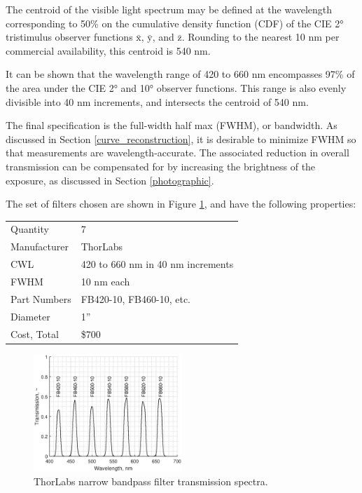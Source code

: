 \documentclass[twocolumn,10pt]{asme2ej}
\begin{document}
The centroid of the visible light spectrum may be defined at the wavelength corresponding to 50\% on the cumulative density function (CDF) of the CIE 2° tristimulus observer functions $\mathrm{\bar{x}}$, $\mathrm{\bar{y}}$, and $\mathrm{\bar{z}}$. Rounding to the nearest 10 nm per commercial availability, this centroid is 540 nm.

It can be shown that the wavelength range of 420 to 660 nm encompasses 97\% of the area under the CIE 2° and 10° observer functions. This range is also evenly divisible into 40 nm increments, and intersects the centroid of 540 nm.

The final specification is the full-width half max (FWHM), or bandwidth. As discussed in Section \ref{curve_reconstruction}, it is desirable to minimize FWHM so that measurements are wavelength-accurate. The associated reduction in overall transmission can be compensated for by increasing the brightness of the exposure, as discussed in Section \ref{photographic}.

The set of filters chosen are shown in Figure \ref{thorlabs_filter_transmission_spectra}, and have the following properties:\\

\begin{tabular}{l l}
Quantity & 7 \\
Manufacturer & ThorLabs \\
CWL & 420 to 660 nm in 40 nm increments \\
FWHM & 10 nm each \\
Part Numbers & FB420-10, FB460-10, etc. \\
Diameter & 1'' \\
Cost, Total & \$700 \\
\end{tabular}

\begin{figure}
\centering
\includegraphics[width=0.5\textwidth]{thorlabs_filter_transmission_spectra.eps}
\caption{ThorLabs narrow bandpass filter transmission spectra.}
\label{thorlabs_filter_transmission_spectra}
\end{figure}
\end{document}
